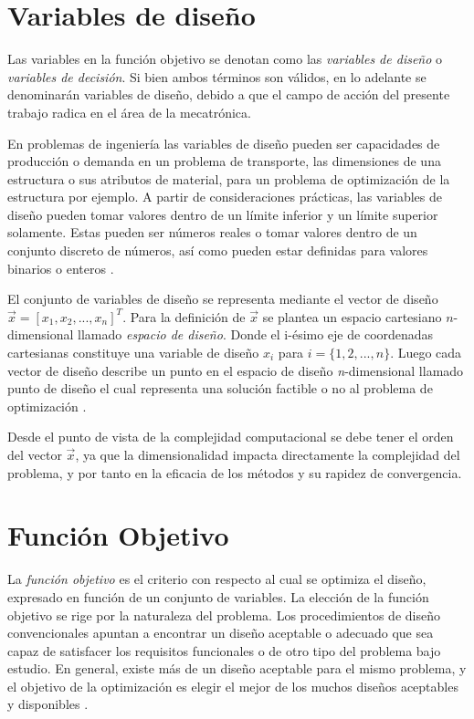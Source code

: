 \section{Variables de diseño}\label{variables}
Las variables en la función objetivo se denotan como las \textit{variables de diseño} o \textit{variables de decisión}. Si bien ambos términos son válidos, en lo adelante se denominarán variables de diseño, debido a que el campo de acción del presente trabajo radica en el área de la mecatrónica.

En problemas de ingeniería las variables de diseño pueden ser capacidades de producción o demanda en un problema de transporte, las dimensiones de una estructura o sus atributos de material, para un problema de optimización de la estructura por ejemplo. A partir de consideraciones prácticas, las variables de diseño pueden tomar valores dentro de un límite inferior y un límite superior solamente. Estas pueden ser números reales o tomar valores dentro de un conjunto discreto de números, así como pueden estar definidas para valores binarios o enteros \cite{arora_optimization:_2015}.

El conjunto de variables de diseño se representa mediante  el vector de diseño $\vec{x}=[x_1, x_2, ..., x_n]^T$. Para la definición de $\vec{x}$ se plantea un espacio cartesiano $n$-dimensional llamado \textit{espacio de diseño}. Donde el i-ésimo eje de coordenadas cartesianas constituye una variable de diseño $x_i$ para  $i = \{1,2, ..., n\}$. Luego cada  vector de diseño describe un punto en el espacio de diseño \textit{n}-dimensional llamado punto de diseño  el cual representa una solución factible o no al problema de optimización \cite{rao_engineering_2009}.

Desde el punto de vista de la complejidad computacional se debe tener el orden del vector $\vec{x}$, ya que la dimensionalidad impacta directamente la complejidad del problema, y por tanto en la eficacia de los métodos y su rapidez de convergencia.

\section{Función Objetivo}
La \textit{función objetivo} es el criterio con respecto al cual se optimiza el diseño, expresado en función de un conjunto de variables. La elección de la función objetivo se rige por la naturaleza del problema. Los procedimientos de diseño convencionales apuntan a encontrar un diseño aceptable o adecuado que sea capaz de satisfacer los requisitos funcionales o de otro tipo del problema bajo estudio. En general, existe más de un diseño aceptable para el mismo problema, y el objetivo de la optimización es elegir el mejor de los muchos diseños aceptables y disponibles \cite{arora_optimization:_2015}.


